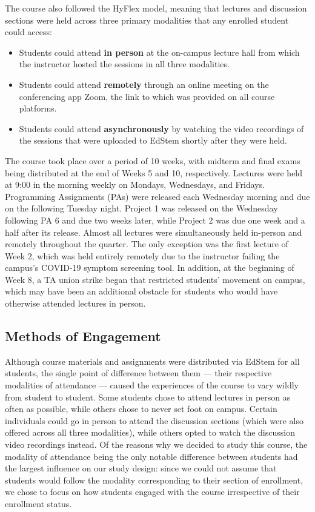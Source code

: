 The course also followed the HyFlex model, meaning that lectures and discussion sections were held across three primary modalities that any enrolled student could access:

\begin{itemize}
  \item Students could attend \textbf{in person} at the on-campus lecture hall from which the instructor hosted the sessions in all three modalities.
  \item Students could attend \textbf{remotely} through an online meeting on the conferencing app Zoom, the link to which was provided on all course platforms.
  \item Students could attend \textbf{asynchronously} by watching the video recordings of the sessions that were uploaded to EdStem shortly after they were held.
\end{itemize}

The course took place over a period of 10 weeks, with midterm and final exams being distributed at the end of Weeks 5 and 10, respectively. Lectures were held at 9:00 in the morning weekly on Mondays, Wednesdays, and Fridays. Programming Assignments (PAs) were released each Wednesday morning and due on the following Tuesday night. Project 1 was released on the Wednesday following PA 6 and due two weeks later, while Project 2 was due one week and a half after its release. Almost all lectures were simultaneously held in-person and remotely throughout the quarter. The only exception was the first lecture of Week 2, which was held entirely remotely due to the instructor failing the campus's COVID-19 symptom screening tool. In addition, at the beginning of Week 8, a TA union strike began that restricted students' movement on campus, which may have been an additional obstacle for students who would have otherwise attended lectures in person.

\subsection{Methods of Engagement}

Although course materials and assignments were distributed via EdStem for all students, the single point of difference between them — their respective modalities of attendance — caused the experiences of the course to vary wildly from student to student. Some students chose to attend lectures in person as often as possible, while others chose to never set foot on campus. Certain individuals could go in person to attend the discussion sections (which were also offered across all three modalities), while others opted to watch the discussion video recordings instead. Of the reasons why we decided to study this course, the modality of attendance being the only notable difference between students had the largest influence on our study design: since we could not assume that students would follow the modality corresponding to their section of enrollment, we chose to focus on how students engaged with the course irrespective of their enrollment status.

